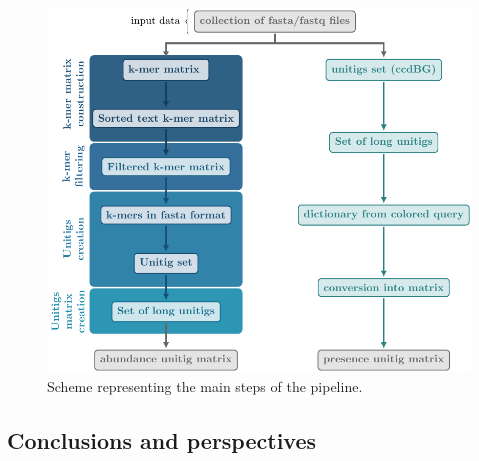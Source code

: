 \begin{figure}[h!]
	\centering
	\includegraphics[width=\linewidth]{figures/kmer_methods/muset_full.pdf}
	\caption[The \muset pipeline]{Scheme representing the main steps of the \muset pipeline.}
	\label{fig:muset}
\end{figure}

\subsection{Conclusions and perspectives}
